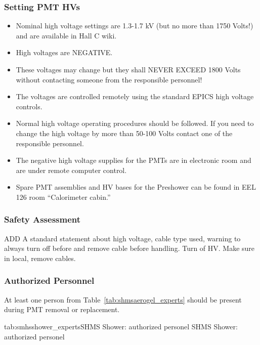 \subsubsection*{Setting PMT HVs}
\begin{itemize}
\item Nominal high voltage settings are 1.3-1.7 kV (but no more than
  1750 Volts!)  and are available in Hall C wiki.
\item High voltages are NEGATIVE. 
\item These voltages may change but they shall NEVER EXCEED 1800 Volts
  without contacting someone from the responsible personnel!
\item The voltages are controlled remotely using the standard EPICS high voltage controls.
\item Normal high voltage operating procedures should be followed. If
  you need to change the high voltage by more than 50-100 Volts
  contact one of the responsible personnel.
\item The negative high voltage supplies for the PMTs are in
  electronic room and are under remote computer control.
\item Spare PMT assemblies and HV bases for the Preshower can be
  found in EEL 126 room ``Calorimeter cabin.''
\end{itemize}

\begin{safetyen}{0}{0}

\subsubsection{Safety Assessment}

ADD A standard statement about high voltage, cable type used, warning
to always turn off before and remove cable before handling.  
Turn of HV.  Make sure in local, remove cables.


\subsubsection{Authorized Personnel}
At least one person from Table~\ref{tab:shmsaerogel_experts} should be
present during PMT removal or replacement.

\begin{namestab}{tab:smhsshower_experts}{SHMS Shower: authorized personel}{
    SHMS Shower: authorized personel}
  \ArshakAsaturyan{}
  \VardanTadevosyan{}
  \HamletMkrtchyan{}
  \ArthurMkrtchyan{}
\end{namestab}

\end{safetyen}

